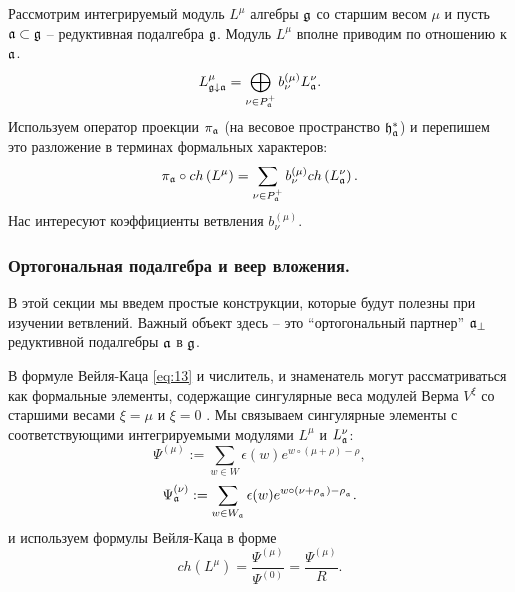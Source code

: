 Рассмотрим интегрируемый модуль $L^{\mu }$ алгебры $\mathfrak{g}$ со старшим весом  $\mu$ и пусть  $\mathfrak{a}\subset\mathfrak{g}$ -- редуктивная подалгебра $\mathfrak{g}$. Модуль $L^{\mu}$ вполне приводим по отношению к $\mathfrak{a}$.
\begin{equation*}
 L_{\mathfrak{g}\downarrow \mathfrak{a}}^{\mu }=\bigoplus
\limits_{\nu \in P_{\mathfrak{a}}^{+}}b_{\nu }^{\left( \mu \right) }L_{\mathfrak{a}}^{\nu }.
\end{equation*}
Используем оператор проекции  $\pi_{\mathfrak{a}}$ (на весовое пространство $\mathfrak{h}_{\mathfrak{a}}^*$) и перепишем это разложение в терминах формальных характеров:
\begin{equation}
\label{branching1}
 \pi _{\mathfrak{a}}\circ ch\left( L^{\mu }\right)
 =\sum_{\nu \in P_{\mathfrak{a}}^{+}}b_{\nu }^{(\mu)}ch\left( L_{\mathfrak{a}}^{\nu }\right) .
\end{equation}
Нас интересуют коэффициенты ветвления $b^{(\mu)}_{\nu}$.
\subsubsection{Ортогональная подалгебра и веер вложения.}
\label{subsec:branching-orthog-pair}

В этой секции мы введем простые конструкции, которые будут полезны при изучении ветвлений. Важный объект здесь -- это ``ортогональный партнер''  $\mathfrak{a}_{\perp}$ редуктивной подалгебры $\mathfrak{a}$ в  $\mathfrak{g}$.

В формуле Вейля-Каца \eqref{eq:13} и числитель, и знаменатель могут рассматриваться как формальные элементы, содержащие сингулярные веса модулей Верма $V^{\xi}$ со старшими весами  $\xi=\mu$ и $\xi=0$ \cite{humphreys1997introduction}.
Мы связываем сингулярные элементы с соответствующими интегрируемыми модулями  $L^{\mu }$ и $L_{\mathfrak{a}}^{\nu }$:
\begin{equation*}
\Psi ^{\left( \mu \right) }:=\sum\limits_{w\in W}\epsilon (w)e^{w\circ (\mu +\rho )-\rho },
\end{equation*}
\begin{equation*}
\Psi _{ \mathfrak{a}}^{\left( \nu \right) }:= \sum\limits_{w\in W_{\mathfrak{a}}}\epsilon (w)e^{w\circ (\nu +\rho_{_{\mathfrak{a}}})-\rho _{_{\mathfrak{a}}}}.
\end{equation*}
и используем формулы Вейля-Каца в форме
\begin{equation}
\label{Weyl-Kac2}
ch\left( L^{\mu }\right) =\frac{\Psi ^{\left( \mu \right) }}{\Psi ^{\left( 0 \right) }}=\frac{\Psi ^{\left( \mu \right) }}{R}.
\end{equation}

